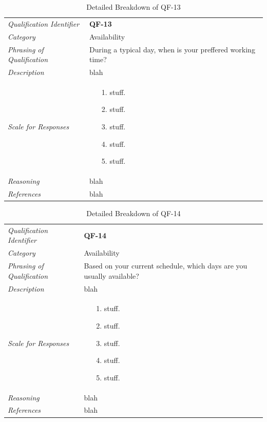 \documentclass[12pt,letterpaper]{article}
\begin{document}
\begin{table}[H]
	\caption{Detailed Breakdown of QF-13}
	\begin{tabu} to 
		\toprule
		Qualification Identifier & {\bf QF-13}\\
		Category & Availability \\
		Phrasing of Qualification & During a typical day, when is your preffered working time? \\
		Description & blah\\
		Scale for Responses &
		\begin{minipage}[t]{\linewidth}
			\begin{enumerate}
				\item[1.] stuff.
				\item[2.] stuff.
				\item[3.] stuff.
				\item[4.] stuff.
				\item[5.] stuff.
			\end{enumerate}
		\end{minipage}\\
		Reasoning & blah\\
		References & blah\\
		\toprule
	\end{tabu}
\end{table}

\begin{table}[H]
	\caption{Detailed Breakdown of QF-14}
	\begin{tabu} to 
		\toprule
		Qualification Identifier & {\bf QF-14}\\
		Category & Availability \\
		Phrasing of Qualification & Based on your current schedule, which days are you usually available? \\
		Description & blah\\
		Scale for Responses &
		\begin{minipage}[t]{\linewidth}
			\begin{enumerate}
				\item[1.] stuff.
				\item[2.] stuff.
				\item[3.] stuff.
				\item[4.] stuff.
				\item[5.] stuff.
			\end{enumerate}
		\end{minipage}\\
		Reasoning & blah\\
		References & blah\\
		\toprule
	\end{tabu}
\end{table}
\end{document}
